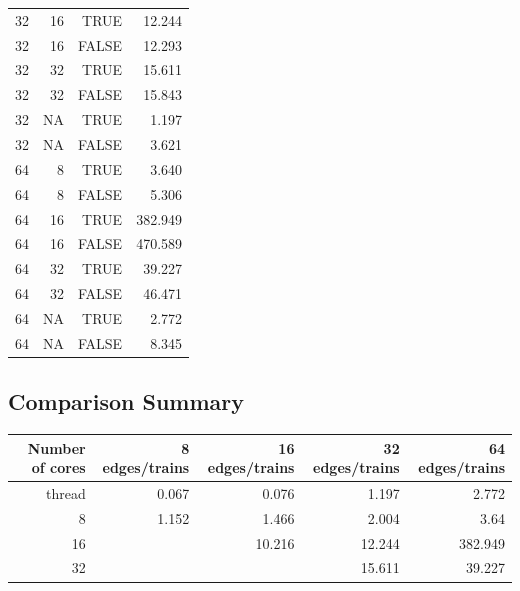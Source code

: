 \documentclass[a4paper,12pt]{article}
\begin{document}
\begin{center}
\begin{tabular}{r r r | r}
		32                      & 16         & TRUE  & 12.244  \\
		32                      & 16         & FALSE & 12.293  \\
		32                      & 32         & TRUE  & 15.611  \\
		32                      & 32         & FALSE & 15.843  \\
		32                      & NA         & TRUE  & 1.197   \\
		32                      & NA         & FALSE & 3.621   \\
		\hline
		64                      & 8          & TRUE  & 3.640   \\
		64                      & 8          & FALSE & 5.306   \\
		64                      & 16         & TRUE  & 382.949 \\
		64                      & 16         & FALSE & 470.589 \\
		64                      & 32         & TRUE  & 39.227  \\
		64                      & 32         & FALSE & 46.471  \\
		64                      & NA         & TRUE  & 2.772   \\
		64                      & NA         & FALSE & 8.345   \\
	\end{tabular}
\end{center}

\subsection{Comparison Summary}
\begin{center}
	\begin{tabular}{r | r r r r}
		\textbf{Number of cores} & 8 edges/trains & 16 edges/trains & 32 edges/trains & 64 edges/trains \\ \hline
		thread                   & 0.067          & 0.076           & 1.197           & 2.772           \\ \hline
		8                        & 1.152          & 1.466           & 2.004           & 3.64            \\
		16                       &                & 10.216          & 12.244          & 382.949         \\
		32                       &                &                 & 15.611          & 39.227          \\
	\end{tabular}
\end{center}
\end{document}
